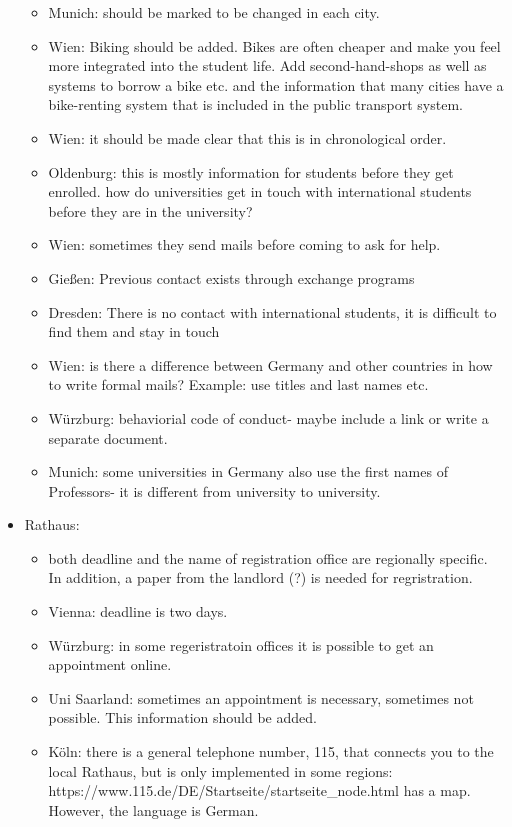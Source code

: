 \begin{itemize}
\begin{itemize}
            \item Munich: should be marked to be changed in each city.
            \item Wien: Biking should be added. Bikes are often cheaper and make you feel more integrated into the student life. Add second-hand-shops as well as systems to borrow a bike etc. and the information that many cities have a bike-renting system that is included in the public transport system.
            \item Wien: it should be made clear that this is in chronological order.
            \item Oldenburg: this is mostly information for students before they get enrolled. how do universities get in touch with international students before they are in the university?
            \item Wien: sometimes they send mails before coming to ask for help.
            \item Gießen: Previous contact exists through exchange programs
            \item Dresden: There is no contact with international students, it is difficult to find them and stay in touch
            \item Wien: is there a difference between Germany and other countries in how to write formal mails? Example: use titles and last names etc.
            \item Würzburg: behaviorial code of conduct- maybe include a link or write a separate document.
            \item Munich: some universities in Germany also use the first names of Professors- it is different from university to university.
          \end{itemize}

        \item Rathaus:
          \begin{itemize}
            \item both deadline and the name of registration office are regionally specific. In addition, a paper from the landlord (?) is needed for regristration.
            \item Vienna: deadline is two days.
            \item Würzburg: in some regeristratoin offices it is possible to get an appointment online.
            \item Uni Saarland: sometimes an appointment is necessary, sometimes not possible. This information should be added.
            \item Köln: there is a general telephone number, 115, that connects you to the local Rathaus, but is only implemented in some regions: https://www.115.de/DE/Startseite/startseite_node.html has a map. However, the language is German.
          \end{itemize}


\end{itemize}
